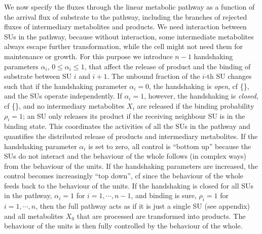 We now specify the fluxes through the linear metabolic pathway as a function of the arrival flux of substrate to the pathway, including the branches of rejected fluxes of intermediary metabolites and products. 
We need interaction between SUs in the pathway, because without interaction, some intermediate metabolites always escape
further transformation, while the cell might not need them for maintenance or growth. 
For this purpose we introduce $n-1$ handshaking parameters $\alpha_i$, $0 \le \alpha_i \le 1$, that affect the release of product and the binding of substrate between SU $i$ and $i+1$. 
The unbound fraction of the $i$-th SU changes such that if the handshaking parameter $\alpha_i = 0$, the handshaking is
\emph{open}, cf \{\pageref{sssec:open_protocol}\}, and the SUs operate independently. 
If $\alpha_i = 1$, however, the handshaking is \emph{closed}, cf \{\pageref{sssec:closed_protocol}\}, and no intermediary
metabolites $X_i$ are released if the binding probability $\rho_i = 1$; 
an SU only releases its product if the receiving neighbour SU is in the binding state. 
This coordinates the activities of all the SUs in the pathway and quantifies the distributed release of products and intermediary metabolites. 
If the handshaking parameter $\alpha_i$ is set to zero, all control is ``bottom up'' because the SUs do not interact and the behaviour of the whole follows (in complex ways) from the behaviour of the units. 
If the handshaking parameters are increased, the control becomes increasingly ``top down'', cf \cite{Sege2001} since the behaviour of the whole feeds back to the behaviour of the units. If the handshaking is closed for all SUs in the pathway, $\alpha_i = 1$ for $i = 1,\cdots,n-1$, and binding is sure, $\rho_i = 1$ for $i = 1,\cdots,n$, then the full pathway acts as if it is just a single SU (see appendix) and all metabolites $X_0$ that are processed are transformed into products. 
The behaviour of the units is then fully controlled by the behaviour of the whole.

